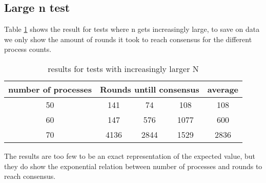 \subsection{Large n test}
Table \ref{table:resultsLargeN} shows the result for tests where n gets increasingly large, to save on data we only show the amount of rounds it took to reach consensus for the different process counts.



\begin{table}[h]
	\begin{tabular}{ | c | c  | c | c |  c |}
		\hline
  		 number of processes & \multicolumn{3}{|c|}{Rounds untill consensus }  & average\\
		\hline
 		50 & 141 & 74 & 108  & 108   \\
		\hline
		60  & 147  &576 & 1077  & 600     \\
		\hline
		70  & 4136 & 2844 & 1529  & 2836    \\
		\hline
	\end{tabular}
	\caption{results for tests with increasingly larger N}	
	\label{table:resultsLargeN}
\end{table}

The results are too few to be an exact representation of the expected value, but they do show the exponential relation between number of processes and rounds to reach consensus.